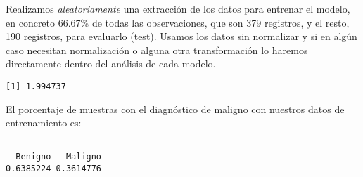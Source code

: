 \documentclass[
]{article}
\newenvironment{Shaded}{\begin{snugshade}}{\end{snugshade}}
\newcommand{\CommentTok}[1]{\textcolor[rgb]{0.56,0.35,0.01}{\textit{#1}}}
\newcommand{\DecValTok}[1]{\textcolor[rgb]{0.00,0.00,0.81}{#1}}
\newcommand{\KeywordTok}[1]{\textcolor[rgb]{0.13,0.29,0.53}{\textbf{#1}}}
\newcommand{\NormalTok}[1]{#1}
\newcommand{\OperatorTok}[1]{\textcolor[rgb]{0.81,0.36,0.00}{\textbf{#1}}}
\newcommand{\StringTok}[1]{\textcolor[rgb]{0.31,0.60,0.02}{#1}}
\begin{document}
Realizamos \emph{aleatoriamente} una extracción de los datos para
entrenar el modelo, en concreto 66.67\% de todas las observaciones, que
son 379 registros, y el resto, 190 registros, para evaluarlo (test).
Usamos los datos sin normalizar y si en algún caso necesitan
normalización o alguna otra transformación lo haremos directamente
dentro del análisis de cada modelo.

\begin{Shaded}
\end{Shaded}

\begin{verbatim}
[1] 1.994737
\end{verbatim}

El porcentaje de muestras con el diagnóstico de maligno con nuestros
datos de entrenamiento es:

\begin{Shaded}
\end{Shaded}

\begin{verbatim}

  Benigno   Maligno 
0.6385224 0.3614776 
\end{verbatim}
\end{document}
